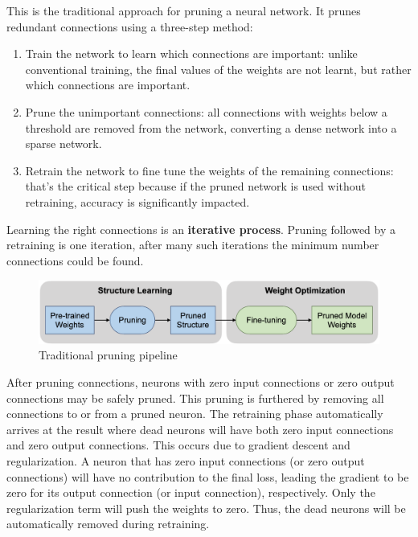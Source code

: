 This is the traditional approach for pruning a neural network. It prunes
redundant connections using a three-step method:
\begin{enumerate}
    \item Train the network to learn which connections are important: unlike
        conventional training, the final values of the weights are not learnt,
        but rather which connections are important.
    \item Prune the unimportant connections: all connections with weights below
        a threshold are removed from the network, converting a dense network
        into a sparse network.
    \item Retrain the network to fine tune the weights of the remaining
        connections: that's the critical step because if the pruned network is
        used without retraining, accuracy is significantly impacted.
\end{enumerate}

Learning the right connections is an \textbf{iterative process}. Pruning
followed by a retraining is one iteration, after many such iterations the
minimum number connections could be found.

\begin{figure}[ht]
    \includegraphics[width=\textwidth]{images/pruning/traditional_pipeline.png}
    \centering
    \caption{Traditional pruning pipeline}\label{fig:traditional_pipeline}
\end{figure}

After pruning connections, neurons with zero input connections or zero output
connections may be safely pruned. This pruning is furthered by removing all
connections to or from a pruned neuron. The retraining phase automatically
arrives at the result where dead neurons will have both zero input connections
and zero output connections.
This occurs due to gradient descent and regularization. A neuron that has zero
input connections (or zero output connections) will have no contribution to the
final loss, leading the gradient to be zero for its output connection (or input
connection), respectively.
Only the regularization term will push the weights to zero. Thus, the dead
neurons will be automatically removed during retraining.~\cite{han2015learning}

